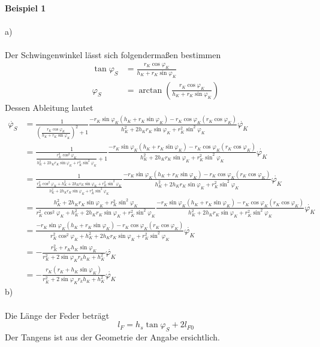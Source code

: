 \textbf{Beispiel 1} \\ \\
a) \\ \\
Der Schwingenwinkel lässt sich folgendermaßen bestimmen
\begin{align*}
	\tan\varphi_S &= \frac{r_K\cos\varphi_K}{h_K + r_K\sin\varphi_K} \\
	\varphi_S &= \arctan\left( \frac{r_K\cos\varphi_K}{h_K + r_K\sin\varphi_K}\right)
\end{align*}
Dessen Ableitung lautet
\begin{align*}
	\dot{\varphi_S} &= \frac{1}{\left( \frac{r_K\cos\varphi_K}{h_K + r_K\sin\varphi_K}\right)^2 + 1} \frac{-r_K\sin\varphi_K(h_K + r_K\sin\varphi_K) - r_K\cos\varphi_K(r_K\cos\varphi_K)}{h_K^2 + 2h_Kr_K\sin\varphi_K + r_K^2\sin^2\varphi_K}\dot{\varphi_K}\\
	&= \frac{1}{\frac{r_K^2\cos^2\varphi_K}{h_K^2 + 2h_Kr_K\sin\varphi_K + r_K^2\sin^2\varphi_K} + 1}\frac{-r_K\sin\varphi_K(h_K + r_K\sin\varphi_K) - r_K\cos\varphi_K(r_K\cos\varphi_K)}{h_K^2 + 2h_Kr_K\sin\varphi_K + r_K^2\sin^2\varphi_K}\dot{\varphi_K} \\
	&= \frac{1}{\frac{r_K^2\cos^2\varphi_K + h_K^2 + 2h_Kr_K\sin\varphi_K + r_K^2\sin^2\varphi_K}{h_K^2 + 2h_Kr_K\sin\varphi_K + r_K^2\sin^2\varphi_K}}\frac{-r_K\sin\varphi_K(h_K + r_K\sin\varphi_K) - r_K\cos\varphi_K(r_K\cos\varphi_K)}{h_K^2 + 2h_Kr_K\sin\varphi_K + r_K^2\sin^2\varphi_K}\dot{\varphi_K} \\
	&= \frac{h_K^2 + 2h_Kr_K\sin\varphi_K + r_K^2\sin^2\varphi_K}{r_K^2\cos^2\varphi_K + h_K^2 + 2h_Kr_K\sin\varphi_K + r_K^2\sin^2\varphi_K}\frac{-r_K\sin\varphi_K(h_K + r_K\sin\varphi_K) - r_K\cos\varphi_K(r_K\cos\varphi_K)}{h_K^2 + 2h_Kr_K\sin\varphi_K + r_K^2\sin^2\varphi_K}\dot{\varphi_K} \\
	&= \frac{-r_K\sin\varphi_K(h_K + r_K\sin\varphi_K) - r_K\cos\varphi_K(r_K\cos\varphi_K)}{r_K^2\cos^2\varphi_K + h_K^2 + 2h_Kr_K\sin\varphi_K + r_K^2\sin^2\varphi_K}\dot{\varphi_K} \\
	&= -\frac{r_K^2 + r_Kh_K\sin\varphi_K}{r_K^2 + 2\sin\varphi_Kr_kh_K + h_K^2}\dot{\varphi_K}\\
	&= -\frac{r_K(r_K + h_K\sin\varphi_K)}{r_K^2 + 2\sin\varphi_Kr_kh_K + h_K^2}\dot{\varphi_K}
\end{align*}
b) \\ \\
Die Länge der Feder beträgt
\[
	l_F = h_s\tan\varphi_S + 2l_{F0}
\]
Der Tangens ist aus der Geometrie der Angabe ersichtlich. \\ \\
